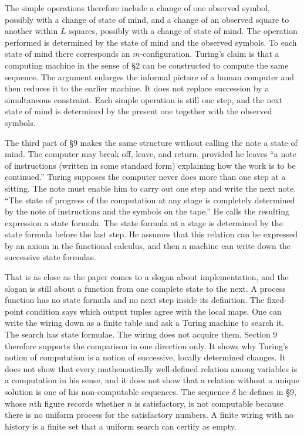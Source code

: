\documentclass[12pt]{article}
\begin{document}
The simple operations therefore include a change of one observed symbol, possibly with a change of state of mind, and a change of an observed square to another within $L$ squares, possibly with a change of state of mind. The operation performed is determined by the state of mind and the observed symbols. To each state of mind there corresponds an $m$-configuration. Turing's claim is that a computing machine in the sense of \S 2 can be constructed to compute the same sequence. The argument enlarges the informal picture of a human computer and then reduces it to the earlier machine. It does not replace succession by a simultaneous constraint. Each simple operation is still one step, and the next state of mind is determined by the present one together with the observed symbols.

The third part of \S 9 makes the same structure without calling the note a state of mind. The computer may break off, leave, and return, provided he leaves ``a note of instructions (written in some standard form) explaining how the work is to be continued.'' Turing supposes the computer never does more than one step at a sitting. The note must enable him to carry out one step and write the next note. ``The state of progress of the computation at any stage is completely determined by the note of instructions and the symbols on the tape.'' He calls the resulting expression a state formula. The state formula at a stage is determined by the state formula before the last step. He assumes that this relation can be expressed by an axiom in the functional calculus, and then a machine can write down the successive state formulae.

That is as close as the paper comes to a slogan about implementation, and the slogan is still about a function from one complete state to the next. A process function has no state formula and no next step inside its definition. The fixed-point condition says which output tuples agree with the local maps. One can write the wiring down as a finite table and ask a Turing machine to search it. The search has state formulae. The wiring does not acquire them. Section 9 therefore supports the comparison in one direction only. It shows why Turing's notion of computation is a notion of successive, locally determined changes. It does not show that every mathematically well-defined relation among variables is a computation in his sense, and it does not show that a relation without a unique solution is one of his non-computable sequences. The sequence $\delta$ he defines in \S 9, whose $n$th figure records whether $n$ is satisfactory, is not computable because there is no uniform process for the satisfactory numbers. A finite wiring with no history is a finite set that a uniform search can certify as empty.
\end{document}
